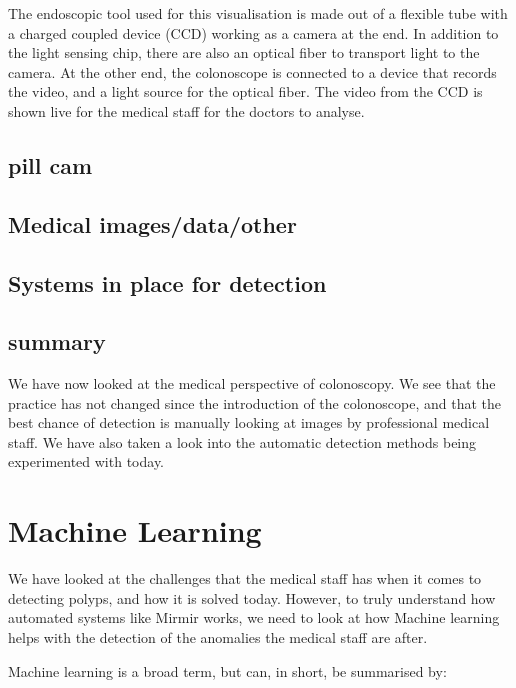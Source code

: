 The endoscopic tool used for this visualisation is made out of a flexible tube with a charged coupled device (CCD) working as a camera at the end. In addition to the light sensing chip, there are also an optical fiber to transport light to the camera. At the other end, the colonoscope is connected to a device that records the video, and a light source for the optical fiber.
The video from the CCD is shown live for the medical staff for the doctors to analyse.


\subsection{pill cam}






\subsection{Medical images/data/other}


    
\subsection{Systems in place for detection}

\subsection{summary}
We have now looked at the medical perspective of colonoscopy. We see that the practice has not changed since the introduction of the colonoscope, and that the best chance of detection is manually looking at images by professional medical staff. We have also taken a look into the automatic detection methods being experimented with today.
    

\section{Machine Learning}
We have looked at the challenges that the medical staff has when it comes to detecting polyps, and how it is solved today.
However, to truly understand how automated systems like Mirmir works, we need to look at how Machine learning helps with the detection of the anomalies the medical staff are after.  

Machine learning is a broad term, but can, in short, be summarised by:\\
\vspace{10px}


